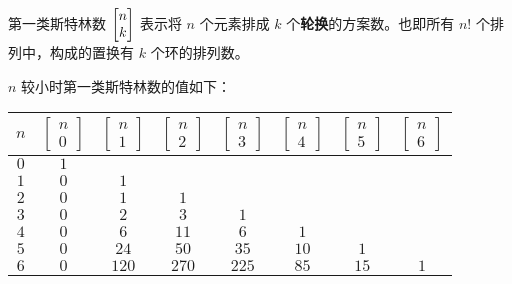 \documentclass[UTF8]{beamer}
\begin{document}
    \begin{frame}{第一类斯特林数}
        $\st{n}{k}$ 表示将 $n$ 个元素排成 $k$ 个\textbf{轮换}的方案数。也即所有 $n!$ 个排列中，构成的置换有 $k$ 个环的排列数。
        \pause

        $n$ 较小时第一类斯特林数的值如下：
        \begin{center}
        \begin{tabular}{|c|ccccccc|}
            \hline
             $n$ &  $\begin{bmatrix}n\\0\end{bmatrix}$  &   $\begin{bmatrix}n\\1\end{bmatrix}$    &            $\begin{bmatrix}n\\2\end{bmatrix}$   &$\begin{bmatrix}n\\3\end{bmatrix}$   &$\begin{bmatrix}n\\4\end{bmatrix}$   &   $\begin{bmatrix}n\\5\end{bmatrix}$   &$\begin{bmatrix}n\\6\end{bmatrix}$  
            \\
            \hline
            $0$&$1$&&&&&&\\
            \hline
            $1$&$0$&$1$&&&&&\\
            \hline
            $2$&$0$&$1$&$1$&&&&\\
            \hline
            $3$&$0$&$2$&$3$&$1$&&&\\
            \hline
            $4$&$0$&$6$&$11$&$6$&$1$&&\\
            \hline
            $5$&$0$&$24$&$50$&$35$&$10$&$1$&\\
            \hline
            $6$&$0$&$120$&$270$&$225$&$85$&$15$&$1$\\
            \hline
            \end{tabular}
        \end{center}
    \end{frame}
\end{document}
